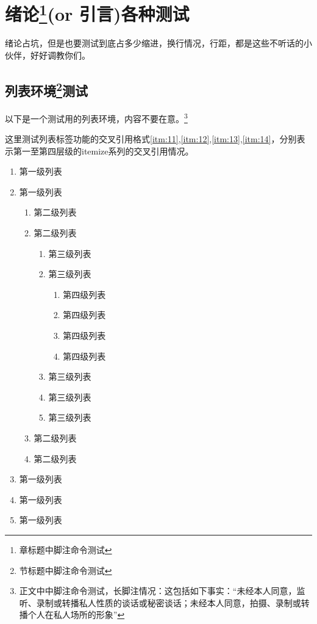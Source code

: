 \chapter{绪论\footnote{章标题中脚注命令测试}(or 引言)各种测试}
绪论占坑，但是也要测试到底占多少缩进，换行情况，行距，都是这些不听话的小伙伴，好好调教你们。

\section{列表环境\footnote{节标题中脚注命令测试}测试}
以下是一个测试用的列表环境，内容不要在意。\footnote{正文中中脚注命令测试，长脚注情况：这包括如下事实：“未经本人同意，监听、录制或转播私人性质的谈话或秘密谈话；未经本人同意，拍摄、录制或转播个人在私人场所的形象”}

这里测试列表标签功能的交叉引用格式\ref{itm:11},\ref{itm:12},\ref{itm:13},\ref{itm:14}，分别表示第一至第四层级的itemize系列的交叉引用情况。
\begin{enumerate}
	\item 第一级列表\label{itm:11}
	\item 第一级列表
	\begin{enumerate}
		\item 第二级列表\label{itm:12}
		\item 第二级列表
		\begin{enumerate}
			\item 第三级列表\label{itm:13}
			\item 第三级列表
			\begin{enumerate}
				\item 第四级列表\label{itm:14}
				\item 第四级列表
				\item 第四级列表
				\item 第四级列表
			\end{enumerate}
			\item 第三级列表
			\item 第三级列表
			\item 第三级列表
		\end{enumerate}
		\item 第二级列表
		\item 第二级列表
	\end{enumerate}
	\item 第一级列表
	\item 第一级列表
	\item 第一级列表
\end{enumerate}


